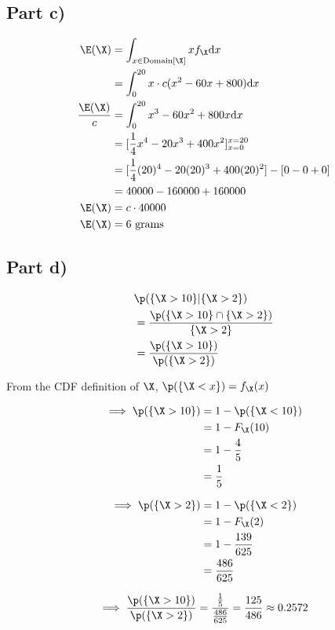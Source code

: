 \subsection{Part c)}

\begin{align}
\E(\X) &= \int _{x \in \mathrm{Domain}[\X]} xf_{\X}\mathrm{d}x \\
&= \int _0 ^{20} x \cdot c(x^2 - 60x + 800)\mathrm{d}x \\
\frac{\E(\X)}{c} &= \int _0 ^{20} x^3 - 60x^2 + 800x \mathrm{d}x \\
 &= [\frac{1}{4} x^4 - 20x^3 + 400x^2]^{x=20}_{x=0} \\
 &= [\frac{1}{4}(20)^4 - 20(20)^3 + 400 (20)^2] - [0 - 0 + 0] \\
 &= 40000 - 160000 + 160000 \\
\E(\X) &= c \cdot 40000 \\
\E(\X) &= 6 \text{ grams}
\end{align}

\subsection{Part d)}

\begin{align}
& \p (\{ \X > 10 \} | \{ \X > 2 \}) \\
&= \frac{\p(\{ \X > 10 \} \cap  \{ \X > 2 \})}{\{ \X > 2 \}} \\
&= \frac{\p(\{ \X > 10 \})}{\p (\{ \X > 2 \})}
\end{align}

From the CDF definition of $\X$, $\p (\{ \X < x \}) = f_{\X}(x)$

\begin{align}
\implies \p(\{ \X > 10 \}) &= 1 - \p (\{ \X < 10 \}) \\
&= 1 - F_{\X}(10) \\
&= 1 - \frac{4}{5} \\
&= \frac{1}{5}
\end{align}

\begin{align}
\implies \p(\{ \X > 2 \}) &= 1 - \p (\{ \X < 2 \}) \\
&= 1 - F_{\X}(2) \\
&= 1 - \frac{139}{625} \\
&= \frac{486}{625}
\end{align}

\[
\implies \frac{\p(\{ \X > 10 \})}{\p (\{ \X > 2 \})}
= \frac{\frac{1}{5}}{\frac{486}{625}}
= \frac{125}{486}
\approx 0.2572
\]

\vspace{0.5cm}
